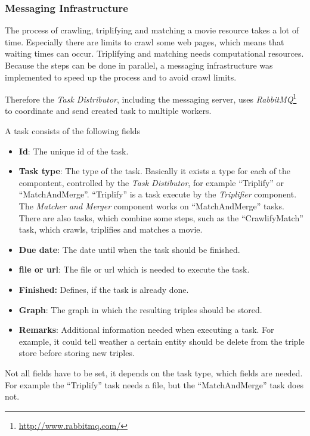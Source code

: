 \subsubsection{Messaging Infrastructure}
\label{subsubsec_messaging_infrastructure}


The process of crawling, triplifying and matching a movie resource takes a lot of time.
Especially there are limits to crawl some web pages, which means that waiting times can occur. Triplifying and matching needs computational resources.
Because the steps can be done in parallel, a messaging infrastructure was implemented to speed up the process and to avoid crawl limits.

Therefore the \textit{Task Distributor}, including the messaging server, uses \emph{RabbitMQ}\footnote{\url{http://www.rabbitmq.com/}} to coordinate and send created task to multiple workers.

A task consists of the following fields
\begin{itemize}
  \item \textbf{Id}:
  The unique id of the task.
  \item \textbf{Task type}:
   The type of the task.
  Basically it exists a type for each of the compontent, controlled by the \textit{Task Distibutor}, for example ``Triplify'' or ``MatchAndMerge''.
  ``Triplify'' is a task execute by the \textit{Triplifier} component.
  The \textit{Matcher and Merger} component works on ``MatchAndMerge'' tasks.
  There are also tasks, which combine some steps, such as the ``CrawlifyMatch'' task, which crawls, triplifies and matches a movie.
  \item \textbf{Due date}:
  The date until when the task should be finished.
  \item \textbf{file or url}:
  The file or url which is needed to execute the task.
  \item \textbf{Finished:}
  Defines, if the task is already done.
  \item \textbf{Graph}:
  The graph in which the resulting triples should be stored.
  \item \textbf{Remarks}:
  Additional information needed when executing a task.
  For example, it could tell weather a certain entity should be delete from the triple store before storing new triples.
\end{itemize}
Not all fields have to be set, it depends on the task type, which fields are needed.
For example the ``Triplify'' task needs a file, but the ``MatchAndMerge'' task does not.

